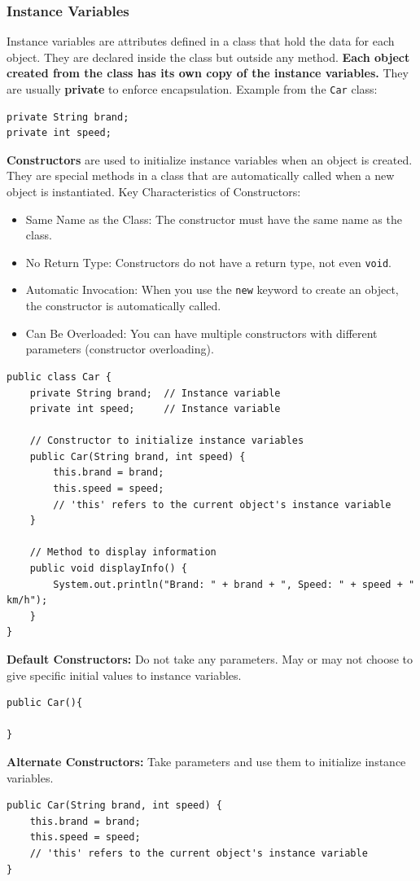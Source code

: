 \documentclass[letterpaper,12pt]{article}
\begin{document}
\subsubsection{Instance Variables}
Instance variables are attributes defined in a class that hold the data for each object. They are declared inside the class but outside any method. \textbf{Each object created from the class has its own copy of the instance variables.} They are usually \textbf{private} to enforce encapsulation. Example from the \texttt{Car} class:
\begin{verbatim}
private String brand;
private int speed;
\end{verbatim}
\textbf{Constructors} are used to initialize instance variables when an object is created. They are special methods in a class that are automatically called when a new object is instantiated. Key Characteristics of Constructors:
\begin{itemize}
    \item Same Name as the Class: The constructor must have the same name as the class.
    \item No Return Type: Constructors do not have a return type, not even \texttt{void}.
    \item Automatic Invocation: When you use the \texttt{new} keyword to create an object, the constructor is automatically called.
    \item Can Be Overloaded: You can have multiple constructors with different parameters (constructor overloading).
\end{itemize}
\begin{verbatim}
public class Car {
    private String brand;  // Instance variable
    private int speed;     // Instance variable

    // Constructor to initialize instance variables
    public Car(String brand, int speed) {
        this.brand = brand;
        this.speed = speed;
        // 'this' refers to the current object's instance variable
    }

    // Method to display information
    public void displayInfo() {
        System.out.println("Brand: " + brand + ", Speed: " + speed + " km/h");
    }
}
\end{verbatim}
\textbf{Default Constructors:} Do not take any parameters. May or may not choose to give specific initial values to instance variables.
\begin{verbatim}
public Car(){

}
\end{verbatim}
\textbf{Alternate Constructors:} Take parameters and use them to initialize instance variables.
\begin{verbatim}
public Car(String brand, int speed) {
    this.brand = brand;
    this.speed = speed;
    // 'this' refers to the current object's instance variable
}
\end{verbatim}
\end{document}
